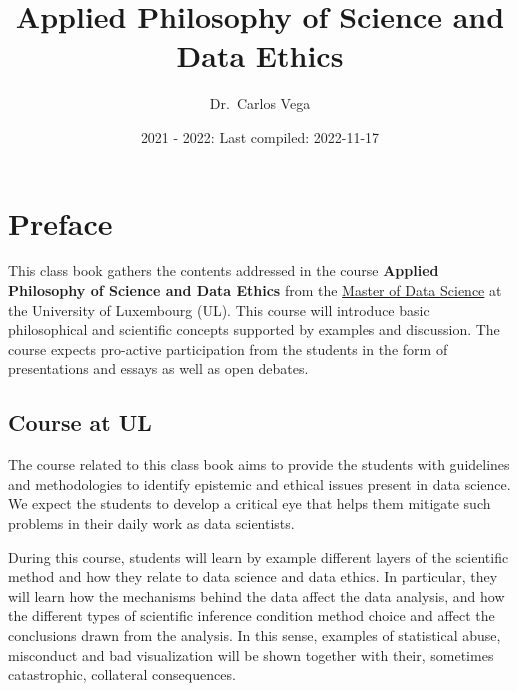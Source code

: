 \documentclass[
]{book}
\title{Applied Philosophy of Science and Data Ethics}
\author{Dr.~Carlos Vega}
\date{2021 - 2022: Last compiled: 2022-11-17}
\let\oldmaketitle\maketitle
\begin{document}
\maketitle

\thispagestyle{empty}


\let\maketitle\oldmaketitle
\maketitle

{
\hypersetup{linkcolor=}
\setcounter{tocdepth}{3}
\tableofcontents
}
\hypertarget{preface}{%
\chapter*{Preface}\label{preface}}

This class book gathers the contents addressed in the course \textbf{Applied Philosophy of Science and Data Ethics} from the \href{https://wwwfr.uni.lu/formations/fstm/master_of_data_science}{Master of Data Science} at the University of Luxembourg (UL). This course will introduce basic philosophical and scientific concepts supported by examples and discussion. The course expects pro-active participation from the students in the form of presentations and essays as well as open debates.

\hypertarget{course-at-ul}{%
\section*{Course at UL}\label{course-at-ul}}

The course related to this class book aims to provide the students with guidelines and methodologies to identify epistemic and ethical issues present in data science. We expect the students to develop a critical eye that helps them mitigate such problems in their daily work as data scientists.

During this course, students will learn by example different layers of the scientific method and how they relate to data science and data ethics. In particular, they will learn how the mechanisms behind the data affect the data analysis, and how the different types of scientific inference condition method choice and affect the conclusions drawn from the analysis. In this sense, examples of statistical abuse, misconduct and bad visualization will be shown together with their, sometimes catastrophic, collateral consequences.
\end{document}
